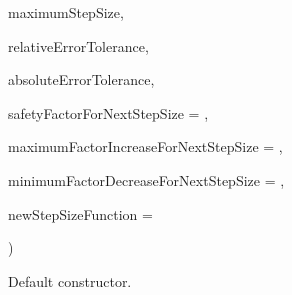 {\begin{DoxyParamCaption}
\item[{const Time\+Step\+Type}]{maximum\+Step\+Size, }
\item[{const typename State\+Type\+::\+Scalar}]{relative\+Error\+Tolerance, }
\item[{const typename State\+Type\+::\+Scalar}]{absolute\+Error\+Tolerance, }
\item[{const Time\+Step\+Type}]{safety\+Factor\+For\+Next\+Step\+Size = {}, }
\item[{const Time\+Step\+Type}]{maximum\+Factor\+Increase\+For\+Next\+Step\+Size = {}, }
\item[{const Time\+Step\+Type}]{minimum\+Factor\+Decrease\+For\+Next\+Step\+Size = {}, }
\item[{const {\bf New\+Step\+Size\+Function} \&}]{new\+Step\+Size\+Function = {}}
\end{DoxyParamCaption}
)\hspace{0.3cm}{\ttfamily [inline]}}\hypertarget{classtudat_1_1numerical__integrators_1_1RungeKuttaVariableStepSizeIntegrator_afce25655a78ccac5a2909749351f8ccb}{}\label{classtudat_1_1numerical__integrators_1_1RungeKuttaVariableStepSizeIntegrator_afce25655a78ccac5a2909749351f8ccb}


Default constructor. 

